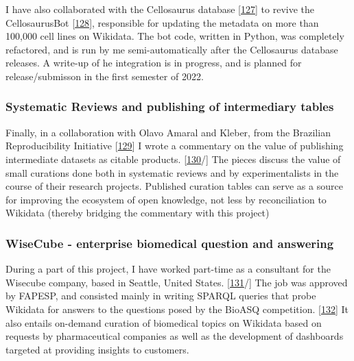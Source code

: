I have also collaborated with the Cellosaurus database {[}\protect\hyperlink{ref-1DguATd9G}{127}{]} to revive the CellosaurusBot {[}\protect\hyperlink{ref-lMQxhx3q}{128}{]}, responsible for updating the metadata on more than 100,000 cell lines on Wikidata. The bot code, written in Python, was completely refactored, and is run by me semi-automatically after the Cellosaurus database releases. A write-up of he integration is in progress, and is planned for release/submisson in the first semester of 2022.

\hypertarget{systematic-reviews-and-publishing-of-intermediary-tables}{%
\subsubsection{Systematic Reviews and publishing of intermediary tables}\label{systematic-reviews-and-publishing-of-intermediary-tables}}

Finally, in a collaboration with Olavo Amaral and Kleber, from the Brazilian Reproducibility Initiative {[}\protect\hyperlink{ref-F2mYjDJ0}{129}{]} I wrote a commentary on the value of publishing intermediate datasets as citable products. {[}\protect\hyperlink{ref-HbZ13t8l}{130}/{]}
The pieces discuss the value of small curations done both in systematic reviews and by experimentalists in the course of their research projects. Published curation tables can serve as a source for improving the ecosystem of open knowledge, not less by reconciliation to Wikidata (thereby bridging the commentary with this project)

\hypertarget{wisecube---enterprise-biomedical-question-and-answering}{%
\subsubsection{WiseCube - enterprise biomedical question and answering}\label{wisecube---enterprise-biomedical-question-and-answering}}

During a part of this project, I have worked part-time as a consultant for the Wisecube company, based in Seattle, United States. {[}\protect\hyperlink{ref-gdYsBE7d}{131}/{]}
The job was approved by FAPESP, and consisted mainly in writing SPARQL queries that probe Wikidata for answers to the questions posed by the BioASQ competition. {[}\protect\hyperlink{ref-rkXotO9x}{132}{]}
It also entails on-demand curation of biomedical topics on Wikidata based on requests by pharmaceutical companies as well as the development of dashboards targeted at providing insights to customers.

